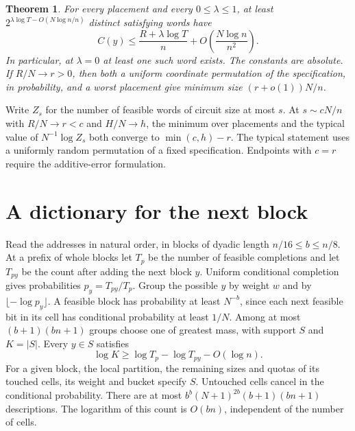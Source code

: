 \documentclass[11pt]{article}
\newtheorem{theorem}{Theorem}[section]
\begin{document}
\begin{theorem}\label{th:quota}
For every placement and every $0\le\lambda\le1$, at least $2^{\lambda\log T-O(N\log n/n)}$ distinct satisfying words have
\[
 C(y)\le \frac{R+\lambda\log T}{n}+O\!\left(\frac{N\log n}{n^2}\right).
\]
In particular, at $\lambda=0$ at least one such word exists. The constants are absolute. If $R/N\to r>0$, then both a uniform coordinate permutation of the specification, in probability, and a worst placement give minimum size $(r+o(1))N/n$.
\end{theorem}
Write $Z_s$ for the number of feasible words of circuit size at most $s$. At $s\sim cN/n$ with $R/N\to r<c$ and $H/N\to h$, the minimum over placements and the typical value of $N^{-1}\log Z_s$ both converge to $\min(c,h)-r$. The typical statement uses a uniformly random permutation of a fixed specification. Endpoints with $c=r$ require the additive-error formulation.

\section{A dictionary for the next block}
Read the addresses in natural order, in blocks of dyadic length $n/16\le b\le n/8$. At a prefix of whole blocks let $T_p$ be the number of feasible completions and let $T_{py}$ be the count after adding the next block $y$. Uniform conditional completion gives probabilities $p_y=T_{py}/T_p$. Group the possible $y$ by weight $w$ and by $\lfloor-\log p_y\rfloor$. A feasible block has probability at least $N^{-b}$, since each next feasible bit in its cell has conditional probability at least $1/N$. Among at most $(b+1)(bn+1)$ groups choose one of greatest mass, with support $S$ and $K=|S|$. Every $y\in S$ satisfies
\begin{equation}\label{eq:credit}
 \log K\ge\log T_p-\log T_{py}-O(\log n).
\end{equation}
For a given block, the local partition, the remaining sizes and quotas of its touched cells, its weight and bucket specify $S$. Untouched cells cancel in the conditional probability. There are at most $b^b(N+1)^{2b}(b+1)(bn+1)$ descriptions. The logarithm of this count is $O(bn)$, independent of the number of cells.
\end{document}
